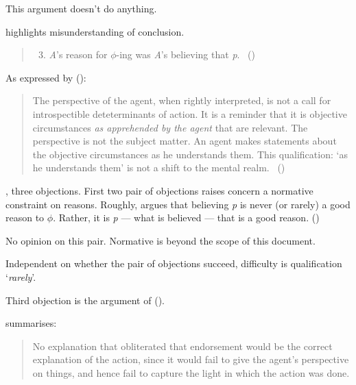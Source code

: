 \begin{note}
  This argument doesn't do anything.

  \citeauthor{Dancy:2000aa} highlights misunderstanding of conclusion.

  \begin{quote}
    \begin{enumerate}[label=(\arabic*\(^{\ast}\)), ref=(\arabic*\(^{\ast}\))]
      \setcounter{enumi}{2}
    \item
      \emph{A}'s reason for \(\phi\)-ing was \emph{A}'s believing that \emph{p}.%
      \mbox{ }\hfill\mbox{(\citeyear[102]{Dancy:2000aa})}
    \end{enumerate}
  \end{quote}

  As expressed by \citeauthor{Collins:1997wn} (\citeyear{Collins:1997wn}):
  \begin{quote}
    The perspective of the agent, when rightly interpreted, is not a call for introspectible deteterminants of action.
    It is a reminder that it is objective circumstances \emph{as apprehended by the agent} that are relevant.
    The perspective is not the subject matter.
    An agent makes statements about the objective circumstances as he understands them.
    This qualification: `as he understands them' is not a shift to the mental realm.%
    \mbox{ }\hfill\mbox{(\citeyear[120]{Collins:1997wn})}
  \end{quote}
\end{note}

\begin{note}
  \citeauthor{Dancy:2000aa}, three objections.
  First two pair of objections \citeauthor{Dancy:2000aa} raises concern a normative constraint on reasons.
  Roughly, \citeauthor{Dancy:2000aa} argues that believing \emph{p} is never (or rarely) a good reason to \(\phi\).
  Rather, it is \emph{p} --- what is believed --- that is a good reason.
  (\citeyear[107]{Dancy:2000aa})

  No opinion on this pair.
  Normative is beyond the scope of this document.

  Independent on whether the pair of objections succeed, difficulty is qualification `\emph{rarely}'.
\end{note}

\begin{note}
  Third objection is the argument of \citeauthor{Collins:1997wn} (\citeyear{Collins:1997wn}).

  \citeauthor{Dancy:2000aa} summarises:
  \begin{quote}
    No explanation that obliterated that endorsement would be the correct explanation of the action, since it would fail to give the agent's perspective on things, and hence fail to capture the light in which the action was done.
    \citeyear[108]{Dancy:2000aa}
  \end{quote}
\end{note}

